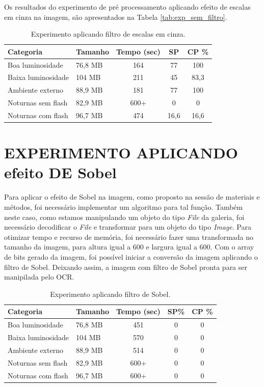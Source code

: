 Os resultados do experimento de pré processamento aplicando efeito de escalas em cinza na imagem, são apresentados na Tabela \ref{tab:exp_sem_filtro}.

\begin{table}[]
\caption{Experimento aplicando filtro de escalas em cinza.}
\label{tab:exp_grey_scale}
\centering
\begin{tabular}{llccc}
\hline
Categoria          & Tamanho    & Tempo (sec) & SP  & CP \% \\ \hline
Boa luminosidade   & 76,8 MB & 164     & 77 & 100         \\
Baixa luminosidade & 104 MB & 211     & 45 & 83,3         \\
Ambiente externo   & 88,9 MB & 181     & 77 & 100         \\
Noturnas sem flash & 82,9 MB & 600+     & 0& 0         \\
Noturnas com flash & 96,7 MB & 474     & 16,6 & 16,6         \\ \hline
\end{tabular}
	\label{fig:exp_grey_scale}
\end{table}



\section{EXPERIMENTO APLICANDO efeito DE Sobel}

Para aplicar o efeito de Sobel na imagem, como proposto na sessão de materiais e métodos, foi necessário implementar um algoritmo para tal função. Também neste caso, como estamos manipulando um objeto do tipo \textit{File} da galeria, foi necessário decodificar o \textit{File} e transformar para um objeto do tipo \textit{Image}. Para otimizar tempo e recurso de memória, foi necessário fazer uma transformada no tamanho da imagem, para altura igual a 600 e largura igual a 600. Com o array de bits gerado da imagem, foi possível iniciar a conversão da imagem aplicando o filtro de Sobel. Deixando assim, a imagem com filtro de Sobel pronta para ser manipilada pelo OCR. 

\begin{table}[]
\caption{Experimento aplicando filtro de Sobel.}
\label{tab:exp_sobel}
\centering
\begin{tabular}{llccc}
\hline
Categoria          & Tamanho    & Tempo (sec) & SP\%  & CP \% \\ \hline
Boa luminosidade   & 76,8 MB & 451     & 0 & 0         \\
Baixa luminosidade & 104 MB & 570     & 0 & 0         \\
Ambiente externo   & 88,9 MB & 514     & 0 & 0         \\
Noturnas sem flash & 82,9 MB & 600+     & 0& 0         \\
Noturnas com flash & 96,7 MB & 600+     & 0 & 0         \\ \hline
\end{tabular}
\end{table}

